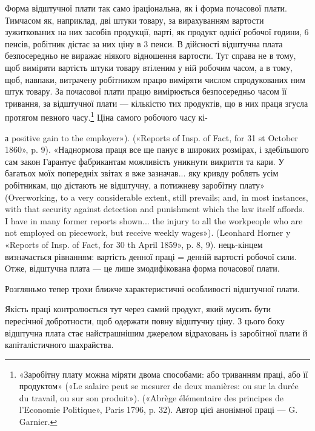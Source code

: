 Форма відштучної плати так само іраціональна, як і форма
почасової плати. Тимчасом як, наприклад, дві штуки товару,
за вирахуванням вартости зужиткованих на них засобів продукції,
варті, як продукт однієї робочої години, 6 пенсів, робітник дістає
за них ціну в 3 пенси. В дійсності відштучна плата безпосередньо
не виражає ніякого відношення вартости. Тут справа не в тому,
щоб виміряти вартість штуки товару втіленим у ній робочим
часом, а в тому, щоб, навпаки, витрачену робітником працю виміряти
числом спродукованих ним штук товару. За почасової
плати працю вимірюється безпосередньо часом її тривання, за
відштучної плати — кількістю тих продуктів, що в них праця
згусла протягом певного часу.\footnote{
«Заробітну плату можна міряти двома способами: або триванням
праці, або її продуктом» («Le salaire peut se mesurer de deux manières:
ou sur la durée du travail, ou sur son produit»). («Abrège élémentaire des
principes de l’Economie Politique», Paris 1796, p. 32). Автор цієї анонімної
праці — G. Garnier.
} Ціна самого робочого часу кі-

а positive gain to the employer»). («Reports of Insp. of Fact, for 31 st
October 1860», p. 9). «Наднормова праця все ще панує в широких розмірах,
і здебільшого сам закон Гарантує фабрикантам можливість уникнути
викриття та кари. У багатьох моїх попередніх звітах я вже зазначав...
яку кривду роблять усім робітникам, що дістають не відштучну, а потижневу
заробітну плату» (Overworking, to a very considerable extent,
still prevails; and, in most instances, with that security against detection
and punishment which the law itself affords. I have in many former reports
shown... the injury to all the workpeople who are not employed on piecework,
but receive weekly wages»). (Leonhard Horner y «Reports of Insp.
of Fact, for 30 th April 1859», p. 8, 9).
нець-кінцем визначається рівнанням: вартість денної праці =
денній вартості робочої сили. Отже, відштучна плата — це лише
змодифікована форма почасової плати.

Розгляньмо тепер трохи ближче характеристичні особливості
відштучної плати.

Якість праці контролюється тут через самий продукт, який
мусить бути пересічної добротности, щоб одержати повну відштучну
ціну. З цього боку відштучна плата стає найстрашнішим
джерелом відраховань із заробітної плати й капіталістичного
шахрайства.

